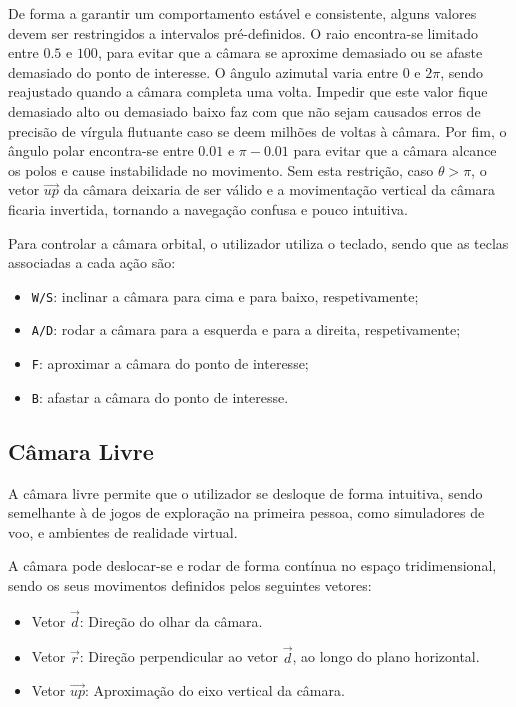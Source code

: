 \documentclass[12pt, a4paper]{article}
\begin{document}
De forma a garantir um comportamento estável e consistente, alguns valores devem ser restringidos a
intervalos pré-definidos. O raio encontra-se limitado entre $0.5$ e $100$, para evitar que a câmara
se aproxime demasiado ou se afaste demasiado do ponto de interesse. O ângulo azimutal varia entre
$0$ e $2\pi$, sendo reajustado quando a câmara completa uma volta. Impedir que este valor fique
demasiado alto ou demasiado baixo faz com que não sejam causados erros de precisão de vírgula
flutuante caso se deem milhões de voltas à câmara. Por fim, o ângulo polar encontra-se entre
$0.01$ e $\pi - 0.01$ para evitar que a câmara alcance os polos e cause instabilidade no
movimento. Sem esta restrição, caso $\theta > \pi$, o vetor $\vec{up}$ da câmara deixaria de ser
válido e a movimentação vertical da câmara ficaria invertida, tornando a navegação confusa e pouco
intuitiva.

Para controlar a câmara orbital, o utilizador utiliza o teclado, sendo que as teclas associadas a
cada ação são:

\begin{itemize}
    \item \texttt{W/S}: inclinar a câmara para cima e para baixo, respetivamente;
    \item \texttt{A/D}: rodar a câmara para a esquerda e para a direita, respetivamente;
    \item \texttt{F}: aproximar a câmara do ponto de interesse;
    \item \texttt{B}: afastar a câmara do ponto de interesse.
\end{itemize}

\subsection{Câmara Livre}

A câmara livre permite que o utilizador se desloque de forma intuitiva, sendo semelhante à de
jogos de exploração na primeira pessoa, como simuladores de voo, e ambientes de realidade
virtual.

A câmara pode deslocar-se e rodar de forma contínua no espaço tridimensional, sendo os seus
movimentos definidos pelos seguintes vetores:

\begin{itemize}
    \item Vetor $\vec{d}$: Direção do olhar da câmara.
    \item Vetor $\vec{r}$: Direção perpendicular ao vetor $\vec{d}$, ao longo do plano horizontal.
    \item Vetor $\vec{up}$: Aproximação do eixo vertical da câmara.
\end{itemize}
\end{document}
